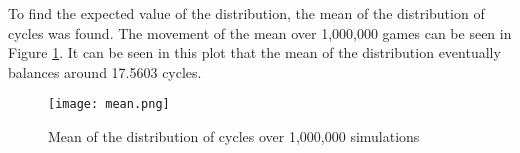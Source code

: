 To find the expected value of the distribution, the mean of the distribution of cycles was found. The movement of the mean over 1,000,000 games can be seen in Figure \ref{fig:mean}. It can be seen in this plot that the mean of the distribution eventually balances around 17.5603 cycles.

\begin{figure}[H]
\centering
\texttt{[image: mean.png]}
\caption{Mean of the distribution of cycles over 1,000,000 simulations}
\label{fig:mean}
\end{figure}